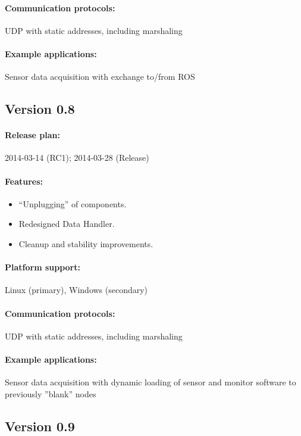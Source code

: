 \paragraph{Communication protocols:} UDP with static addresses, including marshaling
\paragraph{Example applications:} Sensor data acquisition with exchange to/from ROS



\subsection{Version 0.8}

\paragraph{Release plan:} 2014-03-14 (RC1); 2014-03-28 (Release)

\paragraph{Features:}
\begin{itemize}
	\item ``Unplugging'' of components.
	\item Redesigned Data Handler.
	\item Cleanup and stability improvements.
\end{itemize}

\paragraph{Platform support:} Linux (primary), Windows (secondary)
\paragraph{Communication protocols:} UDP with static addresses, including marshaling%
\paragraph{Example applications:} Sensor data acquisition with dynamic loading of sensor and monitor software to previously ''blank'' nodes



\subsection{Version 0.9}

